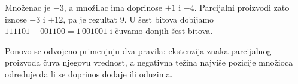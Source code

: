 Množenac je $-3$, a množilac ima doprinose $+1$ i $-4$. Parcijalni proizvodi zato iznose $-3$ i $+12$, pa je rezultat $9$. U šest bitova dobijamo $111101+001100=1\,001001$ i čuvamo donjih šest bitova.

Ponovo se odvojeno primenjuju dva pravila: ekstenzija znaka parcijalnog proizvoda čuva njegovu vrednost, a negativna težina najviše pozicije množioca određuje da li se doprinos dodaje ili oduzima.
